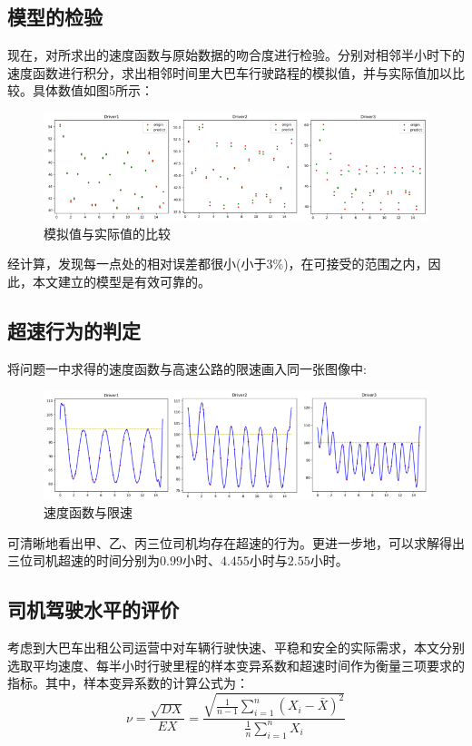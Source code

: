 \documentclass[bwprint]{cumcmthesis}
\begin{document}
        \subsection{模型的检验}
            现在，对所求出的速度函数与原始数据的吻合度进行检验。分别对相邻半小时下的速度函数进行积分，求出相邻时间里大巴车行驶路程的模拟值，并与实际值加以比较。具体数值如图5所示：
            \begin{figure}[htbp]
                \centering
                \includegraphics[width=1\linewidth]{compare.png}
                \caption{模拟值与实际值的比较}
            \end{figure}

            经计算，发现每一点处的相对误差都很小(小于$3\%$)，在可接受的范围之内，因此，本文建立的模型是有效可靠的。
        
        \subsection{超速行为的判定}
        将问题一中求得的速度函数与高速公路的限速画入同一张图像中:
        \begin{figure}[htbp]
            \centering
            \includegraphics[width=1\linewidth]{v100.png}
            \caption{速度函数与限速}
        \end{figure}

        可清晰地看出甲、乙、丙三位司机均存在超速的行为。更进一步地，可以求解得出三位司机超速的时间分别为$0.99$小时、$4.455$小时与$2.55$小时。

        \subsection{司机驾驶水平的评价}
        考虑到大巴车出租公司运营中对车辆行驶快速、平稳和安全的实际需求，本文分别选取平均速度、每半小时行驶里程的样本变异系数和超速时间作为衡量三项要求的指标。其中，样本变异系数的计算公式为：
        \begin{equation*}
            \nu = \frac{\sqrt{DX}}{EX} = \frac{\sqrt{\frac{1}{n-1}\sum_{i=1}^{n}\left(X_i-\bar{X}\right)^2}}{\frac{1}{n}\sum_{i=1}^{n}X_i}
        \end{equation*}
\end{document}
